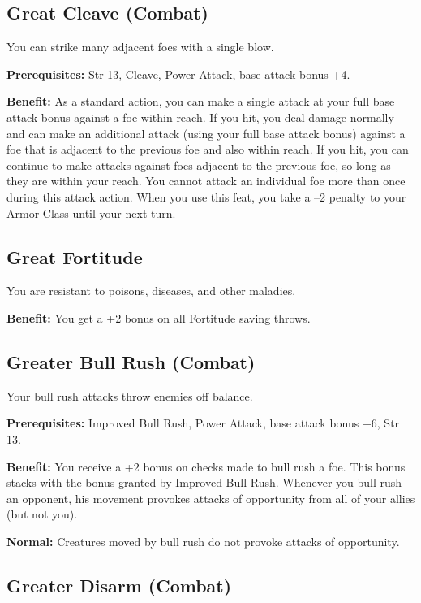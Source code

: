 \subsection{Great Cleave (Combat)}

				
You can strike many adjacent foes with a single blow.
				
\textbf{Prerequisites:} Str 13, Cleave, Power Attack, base attack bonus +4.
				
\textbf{Benefit:} As a standard action, you can make a single attack at your full base attack bonus against a foe within reach. If you hit, you deal damage normally and can make an additional attack (using your full base attack bonus) against a foe that is adjacent to the previous foe and also within reach. If you hit, you can continue to make attacks against foes adjacent to the previous foe, so long as they are within your reach. You cannot attack an individual foe more than once during this attack action. When you use this feat, you take a --2 penalty to your Armor Class until your next turn.
				
\subsection{Great Fortitude}

				
You are resistant to poisons, diseases, and other maladies.
				
\textbf{Benefit:} You get a +2 bonus on all Fortitude saving throws.
				
\subsection{Greater Bull Rush (Combat)}

				
Your bull rush attacks throw enemies off balance.
				
\textbf{Prerequisites:} Improved Bull Rush, Power Attack, base attack bonus +6, Str 13.
				
\textbf{Benefit:} You receive a +2 bonus on checks made to bull rush a foe. This bonus stacks with the bonus granted by Improved Bull Rush. Whenever you bull rush an opponent, his movement provokes attacks of opportunity from all of your allies (but not you).
				
\textbf{Normal:} Creatures moved by bull rush do not provoke attacks of opportunity.
				
\subsection{Greater Disarm (Combat)}

